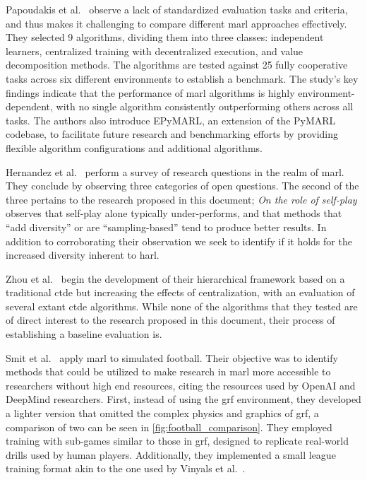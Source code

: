 
Papoudakis et al.~\cite{papoudakis2021} observe a lack of standardized 
evaluation tasks and criteria, and thus makes it challenging to compare 
different \gls{marl} approaches effectively.
They selected 9 algorithms, dividing them into three classes:
independent learners, centralized training with decentralized execution, 
and value decomposition methods.
The algorithms are tested against 25 fully cooperative tasks across 
six different environments to establish a benchmark.
%
The study's key findings indicate that the performance of 
\gls*{marl} algorithms is highly environment-dependent, 
with no single algorithm consistently outperforming others across all tasks. 
The authors also introduce EPyMARL, an extension of the PyMARL codebase, 
to facilitate future research and benchmarking efforts by providing 
flexible algorithm configurations and additional algorithms.

Hernandez et al.~\cite*{hernandez-leal2019} perform a survey of
research questions in the realm of \gls{marl}.
They conclude by observing three categories of open questions.
% 
The second of the three pertains to the research proposed in this document;
\emph{On the role of self-play} observes that self-play alone
typically under-performs, and that methods that ``add diversity''
or are ``sampling-based'' tend to produce better results.
In addition to corroborating their observation we seek to 
identify if it holds for the increased diversity inherent to \gls{harl}.

Zhou et al.~\cite{zhou2023} begin the development of their hierarchical
framework based on a traditional \gls{ctde} but increasing the effects
of centralization, with an evaluation of several extant \gls{ctde}
algorithms. While none of the algorithms that they tested are of
direct interest to the research proposed in this document,
their process of establishing a baseline evaluation is.

Smit et al.~\cite{smit2023} apply \gls{marl} to simulated football.
Their objective was to identify methods that could be utilized to 
make research in \gls{marl} more accessible to researchers without 
high end resources, citing the resources used by OpenAI and DeepMind 
researchers.
%
First, instead of using the \gls{grf} environment, they developed a 
lighter version that omitted the complex physics and graphics of \gls{grf},
a comparison of two can be seen in \cref{fig:football_comparison}. 
They employed training with sub-games similar to those in \gls{grf}, 
designed to replicate real-world drills used by human players. 
Additionally, they implemented a small league training format akin to 
the one used by Vinyals et al.~\cite{vinyals2019}.

